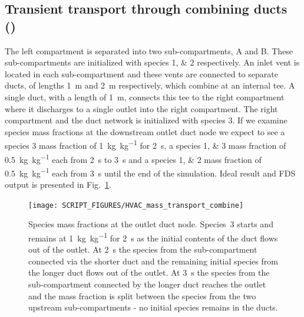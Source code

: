 \documentclass[11pt]{book}
\begin{document}
\subsection{Transient transport through combining ducts (\texorpdfstring{}{HVAC\_mass\_transport\_combine})}
\label{HVAC_mass_transport_combine}
The left compartment is separated into two sub-compartments, A and B. These sub-compartments are initialized with species \numlist{1;2} respectively. An inlet vent is located in each sub-compartment and these vents are connected to separate ducts, of lengths \SI{1}{\meter} and \SI{2}{\meter} respectively, which combine at an internal tee. A single duct, with a length of \SI{1}{\meter}, connects this tee to the right compartment where it discharges to a single outlet into the right compartment. The right compartment and the duct network is initialized with species \num{3}. If we examine species mass fractions at the downstream outlet duct node we expect to see a species \num{3} mass fraction of \SI[per-mode=symbol]{1}{\kilogram\per\kilogram} for \SI{2}{\second}, a species \numlist{1;3} mass fraction of \SI[per-mode=symbol]{0.5}{\kilogram\per\kilogram} each from \SI{2}{\second} to \SI{3}{\second} and a species \numlist{1;2} mass fraction of \SI[per-mode=symbol]{0.5}{\kilogram\per\kilogram} each from \SI{3}{\second} until the end of the simulation. Ideal result and FDS output is presented in Fig.~\ref{fig_HVAC_mass_transport_combine}.

\begin{figure}[ht]
\centering
\texttt{[image: SCRIPT\_FIGURES/HVAC\_mass\_transport\_combine]}
\caption[ test case.]{Species mass fractions at the outlet duct node. Species~3 starts and remains at \SI[per-mode=symbol]{1}{\kilogram\per\kilogram} for \SI{2}{\second} as the initial contents of the duct flows out of the outlet. At \SI{2}{\second} the species from the sub-compartment connected via the shorter duct and the remaining initial species from the longer duct flows out of the outlet. At \SI{3}{\second} the species from the sub-compartment connected by the longer duct reaches the outlet and the mass fraction is split between the species from the two upstream sub-compartments - no initial species remains in the ducts.}
\label{fig_HVAC_mass_transport_combine}
\end{figure}
\end{document}
